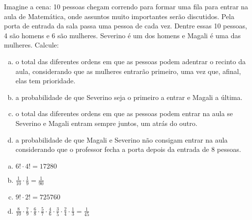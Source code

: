 \begin{ex}
 	Imagine a cena: 10 pessoas chegam correndo para formar uma fila para entrar na aula de Matemática, onde assuntos muito importantes serão discutidos. Pela porta de entrada da sala passa uma pessoa de cada vez. Dentre essas 10 pessoas, 4 são homens e 6 são mulheres. Severino é um dos homens e Magali é uma das mulheres. Calcule:
    \begin{enumerate}[(a)]
    \item o total das diferentes ordens em que as pessoas podem adentrar o recinto da aula, considerando que as mulheres entrarão primeiro, uma vez que, afinal, elas tem prioridade.
    \item a probabilidade de que Severino seja o primeiro a entrar e Magali a última.
    \item o total das diferentes ordens em que as pessoas podem entrar na aula se Severino e Magali entram sempre juntos, um atrás do outro.
    \item a probabilidade de que Magali e Severino não consigam entrar na aula considerando que o professor fecha a porta depois da entrada de 8 pessoas.
    \end{enumerate}
     \begin{sol}
      \phantom{A}
        \begin{enumerate} [(a)]
            \item $ 6!\cdot4!=17280$
            \item $\frac{1}{10}\cdot\frac{1}{9}=\frac{1}{90}$
            \item $9!\cdot2!=725760$
            \item $\frac{8}{10}\cdot\frac{7}{9}\cdot\frac{6}{8}\cdot\frac{5}{7}\cdot\frac{4}{6}\cdot\frac{3}{5}\cdot\frac{2}{4}\cdot\frac{1}{3}=\frac{1}{45}$
        \end{enumerate}
     \end{sol}
\end{ex}